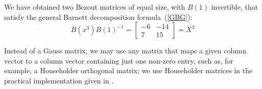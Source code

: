 \documentclass{standalone}
\begin{document}
We have obtained two Bezout matrices of equal size, with $B(1)$ invertible, that satisfy the general Barnett decomposition formula~(\ref{GBG}):
\begin{equation}
	B(x^3)B(1)^{-1} =
	\begin{bmatrix}
		-6 & -14 \\
		7 & 15
	\end{bmatrix}
	= X^3
\end{equation}

\begin{rem}
Instead of a Gauss matrix, we may use any matrix that maps a given column vector to a column vector containing just one non-zero entry, such as, for example, a Householder orthogonal matrix; we use Householder matrices in the practical implementation given in \cite{jp_code}.

\end{rem}
\end{document}
